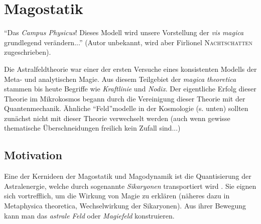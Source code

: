 \chapter[tocentry=Magostatik, head=Magostatik]{Magostatik}
"`Das \emph{Campus Physicus}! Dieses Modell wird unsere Vorstellung der \emph{vis magica} grundlegend verändern..."' (Autor unbekannt, wird aber Firlionel \textsc{Nachtschatten} zugeschrieben).

Die Astralfeldtheorie war einer der ersten Versuche eines konsistenten Modells der Meta- und analytischen Magie. Aus diesem Teilgebiet der \emph{magica theoretica} stammen bis heute Begriffe wie \emph{Kraftlinie} und \emph{Nodix}. Der eigentliche Erfolg dieser Theorie im Mikrokosmos begann durch die Vereinigung dieser Theorie mit der Quantenmechanik.  Ähnliche "`Feld"'modelle in der Kosmologie (s. unten) sollten zunächst nicht mit dieser Theorie verwechselt werden (auch wenn gewisse thematische Überschneidungen freilich kein Zufall sind...)

\section{Motivation}
Eine der Kernideen der Magostatik und Magodynamik ist die Quantisierung der Astralenergie, welche durch sogenannte \emph{Sikaryonen} transportiert wird \cite{quanten}. Sie eignen sich vortrefflich, um die Wirkung von Magie zu erklären (näheres dazu in Metaphysica theoretica, Wechselwirkung der Sikaryonen). Aus ihrer Bewegung kann man das \emph{astrale Feld} oder \emph{Magiefeld} konstruieren.

